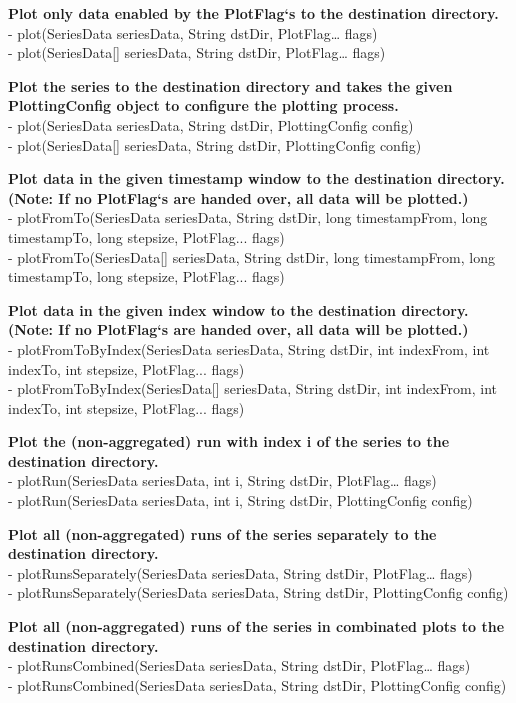 \textbf{Plot only data enabled by the PlotFlag‘s to the destination directory.}\\
- plot(SeriesData seriesData, String dstDir, PlotFlag… flags)\\
- plot(SeriesData[] seriesData, String dstDir, PlotFlag… flags)

\textbf{Plot the series to the destination directory and takes the given PlottingConfig object to configure the plotting process.}\\
- plot(SeriesData seriesData, String dstDir, PlottingConfig config)\\
- plot(SeriesData[] seriesData, String dstDir, PlottingConfig config)

\textbf{Plot data in the given timestamp window to the destination directory. (Note: If no PlotFlag‘s are handed over, all data will be plotted.)}\\
- plotFromTo(SeriesData seriesData, String dstDir, long timestampFrom, long timestampTo, long stepsize, PlotFlag... flags)\\
- plotFromTo(SeriesData[] seriesData, String dstDir, long timestampFrom, long timestampTo, long stepsize, PlotFlag... flags)

\textbf{Plot data in the given index window to the destination directory.
(Note: If no PlotFlag‘s are handed over, all data will be plotted.)}\\
- plotFromToByIndex(SeriesData seriesData, String dstDir, int indexFrom, int indexTo, int stepsize, PlotFlag... flags)\\
- plotFromToByIndex(SeriesData[] seriesData, String dstDir, int indexFrom, int indexTo, int stepsize, PlotFlag... flags)

\textbf{Plot the (non-aggregated) run with index i of the series to the destination directory.}\\
- plotRun(SeriesData seriesData, int i, String dstDir, PlotFlag… flags)\\
- plotRun(SeriesData seriesData, int i, String dstDir, PlottingConfig config)

\textbf{Plot all (non-aggregated) runs of the series separately to the destination directory.}\\
- plotRunsSeparately(SeriesData seriesData, String dstDir, PlotFlag… flags)\\
- plotRunsSeparately(SeriesData seriesData, String dstDir, PlottingConfig config)

\textbf{Plot all (non-aggregated) runs of the series in combinated plots to the destination directory.}\\
- plotRunsCombined(SeriesData seriesData, String dstDir, PlotFlag… flags)\\
- plotRunsCombined(SeriesData seriesData, String dstDir, PlottingConfig config)

